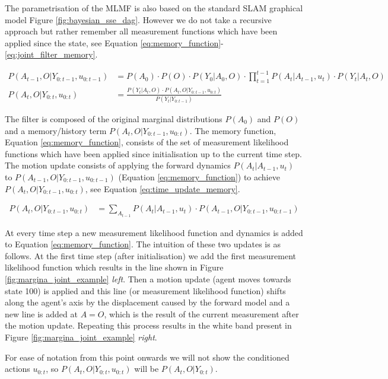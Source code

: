 \documentclass[review]{elsarticle}
\numberwithin{equation}{section}
\begin{document}
The parametrisation of the MLMF is also based on the standard SLAM graphical model Figure \ref{fig:bayesian_sse_dag}. However
we do not take a recursive approach but rather remember all measurement functions which have been applied since 
the state, see Equation \ref{eq:memory_function}-\ref{eq:joint_filter_memory}.

\begin{align} 
 P(A_{t-1},O|Y_{0:t-1},u_{0:t-1}) &= P(A_0) \cdot P(O)  \cdot  P(Y_0|A_0,O) \cdot \prod\limits_{t=1}^{t-1} P(A_t|A_{t-1},u_t) \cdot P(Y_t|A_t,O) \label{eq:memory_function} \\
 P(A_t,O|Y_{0:t},u_{0:t})         &= \frac{P(Y_t|A_t,O) \cdot  P(A_t,O|Y_{0:t-1},u_{0:t})  }{  P(Y_t|Y_{0:t-1}) } \label{eq:joint_filter_memory}
\end{align}

The filter is composed of the original marginal distributions $P(A_0)$ and $P(O)$ and a memory/history term $P(A_{t},O|Y_{0:t-1},u_{0:t})$. 
The memory function, Equation \ref{eq:memory_function}, consists of the set of measurement likelihood functions which have been applied 
since initialisation up to the current time step. The motion update consists of applying the forward dynamics $P(A_t|A_{t-1},u_t)$ to 
$P(A_{t-1},O|Y_{0:t-1},u_{0:t-1})$ (Equation \ref{eq:memory_function}) to achieve $P(A_t,O|Y_{0:t-1},u_{0:t})$, see Equation \ref{eq:time_update_memory}. 

\begin{align}\label{eq:time_update_memory}
 P(A_t,O|Y_{0:t-1},u_{0:t}) &= \sum\limits_{A_{t-1}} P(A_t|A_{t-1},u_t) \cdot  P(A_{t-1},O|Y_{0:t-1},u_{0:t-1})
 \end{align}

At every time step a new measurement likelihood function and dynamics is added to Equation \ref{eq:memory_function}.
The intuition of these two updates is as follows. At the first time step (after initialisation) we add the first measurement 
likelihood function which results in the line shown in Figure \ref{fig:margina_joint_example} \textit{left}. 
Then a motion update (agent moves towards state 100) is applied and this line (or measurement
likelihood function) shifts along the agent's axis by the displacement caused by the forward model and a new line is added at $A=O$, 
which is the result of the current measurement after the motion update. Repeating this process results in the white band present 
in Figure \ref{fig:margina_joint_example} \textit{right}. 

For ease of notation from this point onwards we will not show the conditioned actions $u_{0:t}$, so $P(A_t,O|Y_{0:t},u_{0:t})$ will 
be $P(A_t,O|Y_{0:t})$. 
\end{document}
